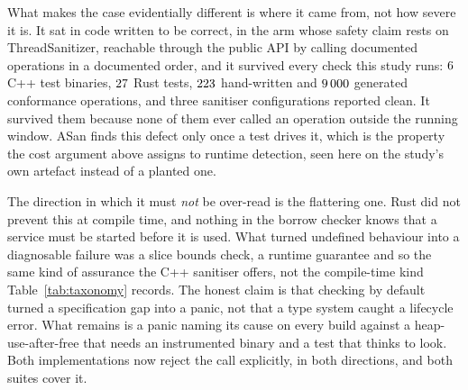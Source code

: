 \documentclass[english,oneside,a4paper,censored,csm,software-track-2020]{HYthesisML}
\begin{document}
What makes the case evidentially different is where it came from, not how severe it is. It sat in
code written to be correct, in the arm whose safety claim rests on ThreadSanitizer, reachable
through the public API by calling documented operations in a documented order, and it survived
every check this study runs: $6$ C++ test binaries, $27$ Rust tests,
$223$ hand-written and $9\,000$ generated conformance operations, and three
sanitiser configurations reported clean. It survived them because none of them ever called an
operation outside the running window. ASan finds this defect only once a test drives it, which is
the property the cost argument above assigns to runtime detection, seen here on the study's own
artefact instead of a planted one.

The direction in which it must \emph{not} be over-read is the flattering one. Rust did not
prevent this at compile time, and nothing in the borrow checker knows that a service must be
started before it is used. What turned undefined behaviour into a diagnosable failure was a
slice bounds check, a runtime guarantee and so the same kind of assurance the C++ sanitiser
offers, not the compile-time kind Table~\ref{tab:taxonomy} records. The honest claim is that
checking by default turned a specification gap into a panic, not that a type system caught a
lifecycle error. What remains is a panic naming its cause on every build against a
heap-use-after-free that needs an instrumented binary and a test that thinks to look. Both
implementations now reject the call explicitly, in both directions, and both suites cover it.
\end{document}

